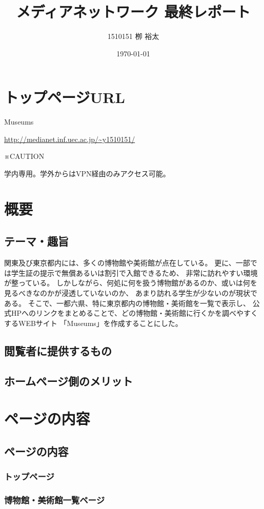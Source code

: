 \documentclass[11pt,a4paper, uplatex]{jsarticle}
\title{メディアネットワーク 最終レポート}
\author{1510151  栁 裕太}
\date{\today}
\begin{document}
\maketitle

\section{トップページURL}
Museums

 \url{http://medianet.inf.uec.ac.jp/~y1510151/}

※CAUTION

学内専用。学外からはVPN経由のみアクセス可能。

\section{概要}
\subsection{テーマ・趣旨}
関東及び東京都内には、多くの博物館や美術館が点在している。
更に、一部では学生証の提示で無償あるいは割引で入館できるため、
非常に訪れやすい環境が整っている。
しかしながら、何処に何を扱う博物館があるのか、或いは何を見るべきなのかが浸透していないのか、
あまり訪れる学生が少ないのが現状である。
そこで、一都六県、特に東京都内の博物館・美術館を一覧で表示し、
公式HPへのリンクをまとめることで、どの博物館・美術館に行くかを調べやすくするWEBサイト
「Museums」を作成することにした。

\subsection{閲覧者に提供するもの}
\subsection{ホームページ側のメリット}

\section{ページの内容}
\subsection{ページの内容}
\subsubsection{トップページ}
\subsubsection{博物館・美術館一覧ページ}
\end{document}
